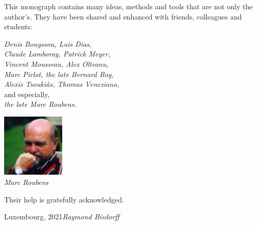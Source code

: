 This monograph contains many ideas, methods and tools that are not only the author’s. They have been shared and enhanced with friends, colleagues and students: 

\vspace{0.5cm}
\begin{minipage}{7cm}
\emph{Denis Bouyssou, Luis Dias,}\\ 
\emph{Claude Lamboray, Patrick Meyer,}\\
\emph{Vincent Mousseau, Alex Olteanu,}\\
\emph{Marc Pirlot, the late Bernard Roy,}\\
\emph{Alexis Tsouki\`as, Thomas Veneziano,}\\
and especially,\\
\emph{the late Marc Roubens}.
\end{minipage}\quad
\begin{minipage}{3cm}
\includegraphics[width=3cm]{Figures/Marc-Roubens.jpg} \\
{\small \emph{Marc Roubens}}
\end{minipage}

\vspace{0.3cm}
Their help is gratefully acknowledged.

\vspace{\baselineskip}
\begin{flushright}\noindent
Luxembourg, 2021\hfill {\it Raymond Bisdorff}\\
\end{flushright}


